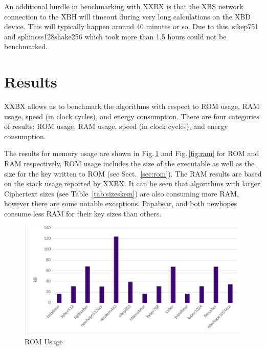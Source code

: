 \documentclass[10pt]{article}
\begin{document}
An additional hurdle in benchmarking with XXBX is that 
the XBS network connection to the XBH will timeout during very long calculations on 
the XBD device. This will typically happen around 40 minutes or so.
Due to this, sikep751 and sphincss128shake256 which took more than 1.5 hours
could not be benchmarked.


\section{Results}

XXBX allows us to benchmark the algorithms with respect to ROM usage, RAM usage,
speed (in clock cycles), and energy consumption. 
There are four categories of results: ROM usage, RAM usage, speed (in clock cycles), 
and energy consumption.

The results for memory usage are shown in Fig.\,\ref{fig:rom} and Fig.\,\ref{fig:ram} for
ROM and RAM respectively. ROM usage includes the size of the executable as well as the 
size for the key written to ROM (see Sect.~\ref{sec:rom}). 
The RAM results are based on the stack usage reported by XXBX. It can be seen that
algorithms with larger Ciphertext sizes (see Table~\ref{tab:sizeskem}) are also consuming
more RAM, however there are some notable exceptions. Papabear, and both newhopes consume
less RAM for their key sizes than others.


\begin{figure}[ht]
    \centering
    \includegraphics[scale=0.8]{./figures/rom.pdf}
    \caption{ROM Usage}
    \label{fig:rom}
\end{figure}
\end{document}
